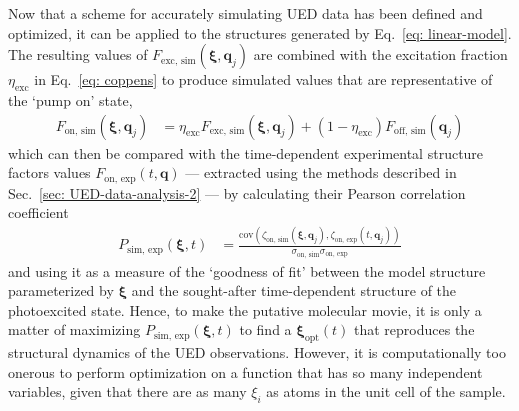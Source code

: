 Now that a scheme for accurately simulating UED data has been defined and optimized,
it can be applied to the structures generated by Eq.~\eqref{eq: linear-model}.
The resulting values of $F_\text{exc, sim}(\boldsymbol{\xi}, \boldsymbol{q}_j)$
are combined with the excitation fraction $\eta_\text{exc}$ in Eq.~\eqref{eq: coppens}
to produce simulated values that are representative of the `pump on' state,
%
\begin{equation}
  \begin{aligned}
    F_\text{on, sim}(\boldsymbol{\xi}, \boldsymbol{q}_j)
      & = \eta_\text{exc} F_\text{exc, sim}(\boldsymbol{\xi}, \boldsymbol{q}_j)
        + \left( 1 - \eta_\text{exc} \right) F_\text{off, sim}(\boldsymbol{q}_j)
  \end{aligned}
\end{equation}
%
which can then be compared with the time-dependent experimental structure factors values
$F_\text{on, exp}(t, \boldsymbol{q})$
--- extracted using the methods described in Sec.~\ref{sec: UED-data-analysis-2} ---
by calculating their Pearson correlation coefficient
%
\begin{equation}
  \begin{aligned}
    P_\text{sim, exp}(\boldsymbol{\xi}, t)
      & = \frac{\text{cov}(\zeta_\text{on, sim}(\boldsymbol{\xi}, \boldsymbol{q}_j), \zeta_\text{on, exp}(t, \boldsymbol{q}_j))}{\sigma_\text{on, sim} \sigma_\text{on, exp}}
  \end{aligned}
\end{equation}
%
and using it as a measure of the `goodness of fit' between the model structure
parameterized by $\boldsymbol{\xi}$ and the sought-after time-dependent structure of the photoexcited state.
%
Hence, to make the putative molecular movie, it is only a matter of maximizing
$P_\text{sim, exp}(\boldsymbol{\xi}, t)$ to find a $\boldsymbol{\xi}_\text{opt}(t)$
that reproduces the structural dynamics of the UED observations.
%
However, it is computationally too onerous to perform optimization on a function that
has so many independent variables, given that there are as many $\xi_i$ as atoms in the unit cell
of the sample.

